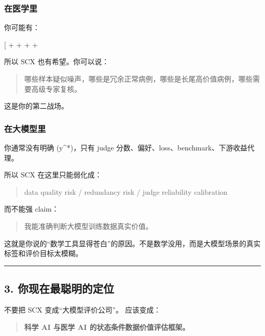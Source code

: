 \documentclass[
  12pt,
]{ctexart}
\begin{document}
\subsubsection{在医学里}\label{ux5728ux533bux5b66ux91cc}

你可能有：

{[}  +  +  +
 + \text{不确定标签}{]}

所以 SCX 也有希望。你可以说：

\begin{quote}
哪些样本疑似噪声，哪些是冗余正常病例，哪些是长尾高价值病例，哪些需要高级专家复核。
\end{quote}

这是你的第二战场。

\subsubsection{在大模型里}\label{ux5728ux5927ux6a21ux578bux91cc}

你通常没有明确 (y\^{}*)，只有 judge
分数、偏好、loss、benchmark、下游收益代理。

所以 SCX 在这里只能弱化成：

\begin{quote}
data quality risk / redundancy risk / judge reliability calibration
\end{quote}

而不能强 claim：

\begin{quote}
我能准确判断大模型训练数据真实价值。
\end{quote}

这就是你说的``数学工具显得苍白''的原因。不是数学没用，而是大模型场景的真实标签和评价目标太模糊。

\begin{center}\rule{0.5\linewidth}{0.5pt}\end{center}

\subsection{3.
你现在最聪明的定位}\label{ux4f60ux73b0ux5728ux6700ux806aux660eux7684ux5b9aux4f4d}

不要把 SCX 变成``大模型评价公司''。 应该变成：

\begin{quote}
\textbf{科学 AI 与医学 AI 的状态条件数据价值评估框架。}
\end{quote}
\end{document}
